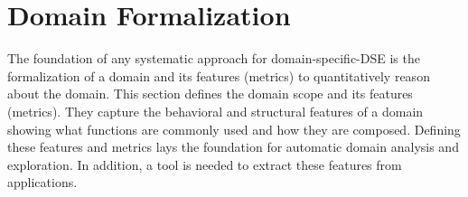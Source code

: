 \section{Domain Formalization}
\label{sec:Domain}

The foundation of any systematic approach for domain-specific-DSE is the formalization of a domain and its features (metrics) to quantitatively reason about the domain. This section defines the domain scope and its features (metrics). They capture the behavioral and structural features of a domain showing what functions are commonly used and how they are composed. Defining these features and metrics lays the foundation for automatic domain analysis and exploration. In addition, a tool is needed to extract these features from applications.













